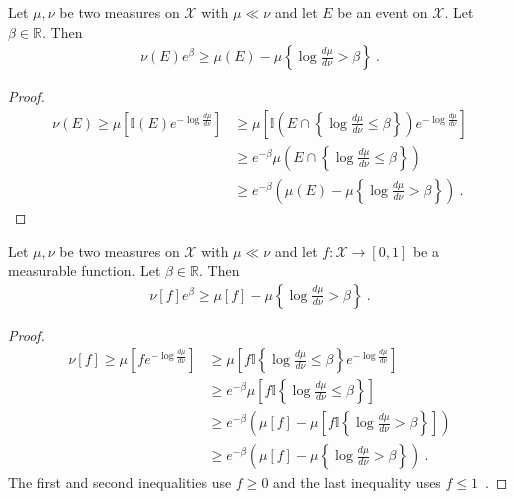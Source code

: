 \begin{lemma}
  \label{lem:llr_change_measure}
  \leanok
  Let $\mu, \nu$ be two measures on $\mathcal X$ with $\mu \ll \nu$ and let $E$ be an event on $\mathcal X$. Let $\beta \in \mathbb{R}$. Then
  \begin{align*}
  \nu(E) e^{\beta} \ge \mu(E) - \mu\left\{ \log\frac{d \mu}{d \nu} > \beta \right\} \: .
  \end{align*}
\end{lemma}

\begin{proof}\leanok
\begin{align*}
\nu(E)
\ge \mu\left[\mathbb{I}(E) e^{- \log\frac{d \mu}{d \nu} }\right]
&\ge \mu\left[\mathbb{I}\left(E \cap \left\{\log\frac{d \mu}{d \nu} \le \beta\right\}\right) e^{- \log\frac{d \mu}{d \nu} }\right]
\\
&\ge e^{- \beta}\mu\left(E \cap \left\{\log\frac{d \mu}{d \nu} \le \beta\right\}\right)
\\
&\ge e^{- \beta}\left( \mu(E) - \mu\left\{ \log\frac{d \mu}{d \nu} > \beta \right\} \right)
\: .
\end{align*}
\end{proof}


\begin{lemma}
  \label{lem:llr_change_measure_fun}
  \uses{}
  Let $\mu, \nu$ be two measures on $\mathcal X$ with $\mu \ll \nu$ and let $f : \mathcal X \to [0,1]$ be a measurable function. Let $\beta \in \mathbb{R}$. Then
  \begin{align*}
  \nu[f] e^{\beta} \ge \mu[f] - \mu\left\{ \log\frac{d \mu}{d \nu} > \beta \right\} \: .
  \end{align*}
\end{lemma}

\begin{proof}%
\uses{}
\begin{align*}
\nu[f]
\ge \mu\left[f e^{- \log\frac{d \mu}{d \nu} }\right]
&\ge \mu\left[f \mathbb{I}\left\{\log\frac{d \mu}{d \nu} \le \beta\right\} e^{- \log\frac{d \mu}{d \nu} }\right]
\\
&\ge e^{- \beta}\mu\left[f \mathbb{I}\left\{\log\frac{d \mu}{d \nu} \le \beta\right\} \right]
\\
&\ge e^{- \beta}\left( \mu[f] - \mu\left[f \mathbb{I}\left\{ \log\frac{d \mu}{d \nu} > \beta \right\}\right] \right)
\\
&\ge e^{- \beta}\left( \mu[f] - \mu \left\{ \log\frac{d \mu}{d \nu} > \beta \right\}\right)
\: .
\end{align*}
The first and second inequalities use $f \ge 0$ and the last inequality uses $f \le 1$~.
\end{proof}


